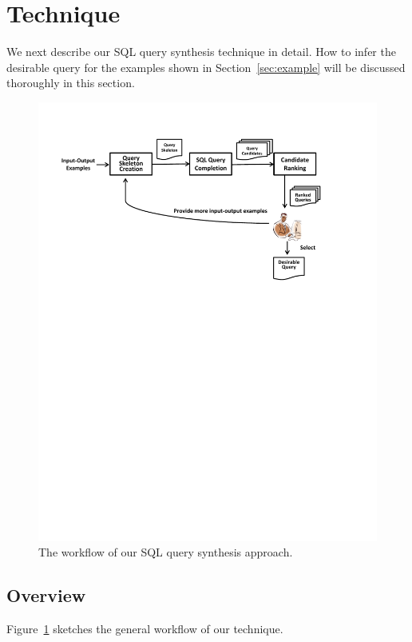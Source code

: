 
\section{Technique}
\label{sec:approach}



We next describe our SQL query synthesis technique in detail.
How to infer the desirable query for the examples
shown in Section~\ref{sec:example} will
be discussed thoroughly in this section.

\begin{figure}[t]
  \centering
  \includegraphics[scale=0.53]{workflow}
  \vspace*{-5.0ex}\caption {{\label{fig:workflow} The workflow of our SQL query synthesis approach.
}}

\end{figure}

\subsection{Overview}
Figure~\ref{fig:workflow} sketches the general workflow of our technique.

